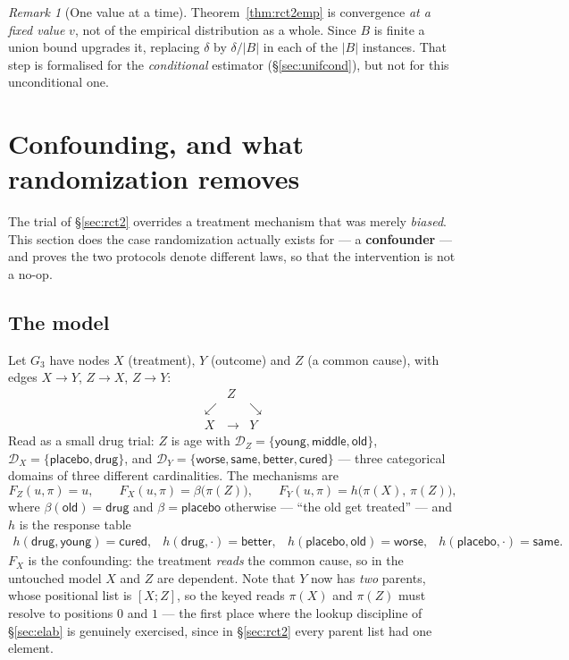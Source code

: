 \documentclass[11pt,a4paper]{article}
\theoremstyle{definition}
\theoremstyle{plain}
\theoremstyle{remark}
\newtheorem{remark}[definition]{Remark}
\newcommand{\dom}{\mathcal{D}}
\begin{document}
\begin{remark}[One value at a time]
\label{rem:onevalue}
Theorem~\ref{thm:rct2emp} is convergence \emph{at a fixed value} $v$, not
of the empirical distribution as a whole. Since $B$ is finite a union
bound upgrades it, replacing $\delta$ by $\delta/|B|$ in each of the $|B|$
instances. That step is formalised for the \emph{conditional} estimator
(\S\ref{sec:unifcond}), but not for this unconditional one.
\end{remark}

\section{Confounding, and what randomization removes}
\label{sec:rct3}

The trial of \S\ref{sec:rct2} overrides a treatment mechanism that was
merely \emph{biased}. This section does the case randomization actually
exists for --- a \textbf{confounder} --- and proves the two protocols
denote different laws, so that the intervention is not a no-op.

\subsection{The model}

Let $G_3$ have nodes $X$ (treatment), $Y$ (outcome) and $Z$ (a common
cause), with edges $X \to Y$, $Z \to X$, $Z \to Y$:
\[
\begin{array}{ccc}
     & Z & \\
 \swarrow & & \searrow \\
 X & \longrightarrow & Y
\end{array}
\]
Read as a small drug trial: $Z$ is age with
$\dom_Z = \{\textsf{young},\textsf{middle},\textsf{old}\}$,
$\dom_X = \{\textsf{placebo},\textsf{drug}\}$, and
$\dom_Y = \{\textsf{worse},\textsf{same},\textsf{better},\textsf{cured}\}$
--- three categorical domains of three different cardinalities. The
mechanisms are
\[
  F_Z(u,\pi) = u,
  \qquad
  F_X(u,\pi) = \beta\bigl(\pi(Z)\bigr),
  \qquad
  F_Y(u,\pi) = h\bigl(\pi(X),\,\pi(Z)\bigr),
\]
where $\beta(\textsf{old}) = \textsf{drug}$ and $\beta = \textsf{placebo}$
otherwise --- ``the old get treated'' --- and $h$ is the response table
\[
\begin{array}{llll}
  h(\textsf{drug},\textsf{young}) = \textsf{cured}, &
  h(\textsf{drug},\cdot) = \textsf{better}, &
  h(\textsf{placebo},\textsf{old}) = \textsf{worse}, &
  h(\textsf{placebo},\cdot) = \textsf{same}.
\end{array}
\]
$F_X$ is the confounding: the treatment \emph{reads} the common cause, so
in the untouched model $X$ and $Z$ are dependent. Note that $Y$ now has
\emph{two} parents, whose positional list is $[X; Z]$, so the keyed reads
$\pi(X)$ and $\pi(Z)$ must resolve to positions $0$ and $1$ --- the first
place where the lookup discipline of \S\ref{sec:elab} is genuinely
exercised, since in \S\ref{sec:rct2} every parent list had one element.
\end{document}

